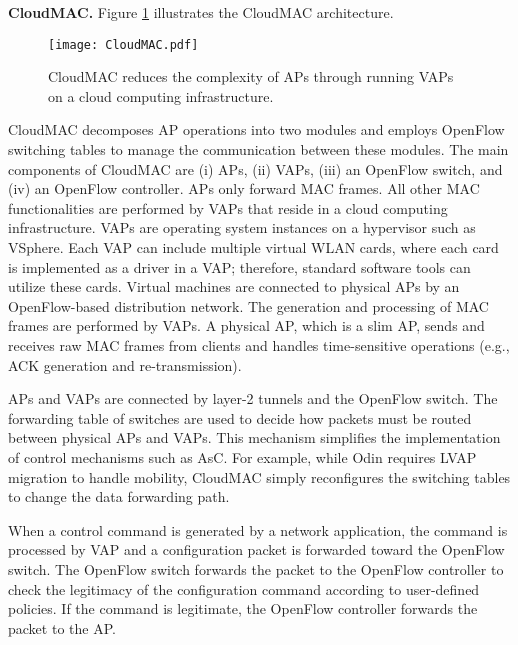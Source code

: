 \textbf{CloudMAC. }
Figure \ref{fig_CloudMAC} illustrates the CloudMAC \cite{CloudMAC,CloudMAC3} architecture. 
%
\begin{figure}[!t]
	\centering
	\texttt{[image: CloudMAC.pdf]}
	\caption{CloudMAC \cite{CloudMAC} reduces the complexity of APs through running VAPs on a cloud computing infrastructure.}
	\label{fig_CloudMAC}
\end{figure}
%
CloudMAC decomposes AP operations into two modules and employs OpenFlow switching tables to manage the communication between these modules.
The main components of CloudMAC are (i) APs, (ii) VAPs, (iii) an OpenFlow switch, and (iv) an OpenFlow controller. 
APs only forward MAC frames. 
All other MAC functionalities are performed by VAPs that reside in a cloud computing infrastructure. 
VAPs are operating system instances on a hypervisor such as VSphere.
Each VAP can include multiple virtual WLAN cards, where each card is implemented as a driver in a VAP; therefore, standard software tools can utilize these cards.
Virtual machines are connected to physical APs by an OpenFlow-based distribution network. 
The generation and processing of MAC frames are performed by VAPs. 
A physical AP, which is a slim AP, sends and receives raw MAC frames from clients and handles time-sensitive operations (e.g., ACK generation and re-transmission).

APs and VAPs are connected by layer-2 tunnels \cite{capsulator} and the OpenFlow switch.
The forwarding table of switches are used to decide how packets must be routed between physical APs and VAPs.
This mechanism simplifies the implementation of control mechanisms such as AsC.
For example, while Odin requires LVAP migration to handle mobility, CloudMAC simply reconfigures the switching tables to change the data forwarding path.


When a control command is generated by a network application, the command is processed by VAP and a configuration packet is forwarded toward the OpenFlow switch.
The OpenFlow switch forwards the packet to the OpenFlow controller to check the legitimacy of the configuration command according to user-defined policies. 
If the command is legitimate, the OpenFlow controller forwards the packet to the AP. 

